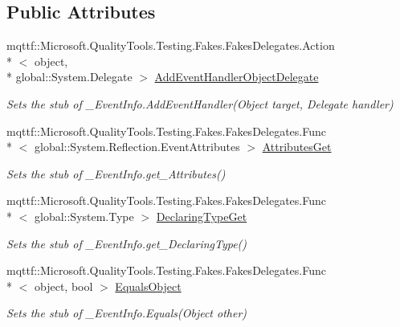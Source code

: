 \subsection*{Public Attributes}
\begin{DoxyCompactItemize}
\item 
mqttf\-::\-Microsoft.\-Quality\-Tools.\-Testing.\-Fakes.\-Fakes\-Delegates.\-Action\\*
$<$ object, \\*
global\-::\-System.\-Delegate $>$ \hyperlink{class_system_1_1_runtime_1_1_interop_services_1_1_fakes_1_1_stub___event_info_a09cac7397a0d4ecc6c503992a1861e9a}{Add\-Event\-Handler\-Object\-Delegate}
\begin{DoxyCompactList}\small\item\em Sets the stub of \-\_\-\-Event\-Info.\-Add\-Event\-Handler(\-Object target, Delegate handler)\end{DoxyCompactList}\item 
mqttf\-::\-Microsoft.\-Quality\-Tools.\-Testing.\-Fakes.\-Fakes\-Delegates.\-Func\\*
$<$ global\-::\-System.\-Reflection.\-Event\-Attributes $>$ \hyperlink{class_system_1_1_runtime_1_1_interop_services_1_1_fakes_1_1_stub___event_info_a9b7064f638a2d20ffc7d3363636d14e6}{Attributes\-Get}
\begin{DoxyCompactList}\small\item\em Sets the stub of \-\_\-\-Event\-Info.\-get\-\_\-\-Attributes()\end{DoxyCompactList}\item 
mqttf\-::\-Microsoft.\-Quality\-Tools.\-Testing.\-Fakes.\-Fakes\-Delegates.\-Func\\*
$<$ global\-::\-System.\-Type $>$ \hyperlink{class_system_1_1_runtime_1_1_interop_services_1_1_fakes_1_1_stub___event_info_a5b6cec9dbb172954db4909e08ca3188d}{Declaring\-Type\-Get}
\begin{DoxyCompactList}\small\item\em Sets the stub of \-\_\-\-Event\-Info.\-get\-\_\-\-Declaring\-Type()\end{DoxyCompactList}\item 
mqttf\-::\-Microsoft.\-Quality\-Tools.\-Testing.\-Fakes.\-Fakes\-Delegates.\-Func\\*
$<$ object, bool $>$ \hyperlink{class_system_1_1_runtime_1_1_interop_services_1_1_fakes_1_1_stub___event_info_aa256bb76a6b560c426ab03692615442a}{Equals\-Object}
\begin{DoxyCompactList}\small\item\em Sets the stub of \-\_\-\-Event\-Info.\-Equals(\-Object other)\end{DoxyCompactList}\item 

\end{DoxyCompactItemize}
